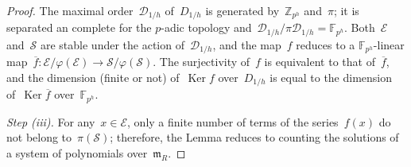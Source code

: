 \documentclass{article}
\theoremstyle{definition}
\let\ro\mathcal \let\go\mathfrak
\DeclareMathOperator\Ker{Ker}
\def\O{\ro O}
\def\Fp{{\mathbb{F}_p}}
\def\Fph{{\mathbb{F}_{p^h}}}
\begin{document}
\begin{proof}
% 
% 
The maximal order~$\ro D_{1/h}$ of~$D_{1/h}$ is
generated by~$ℤ_{p^h}$ and~$π$; it is separated an complete for the
$p$-adic topology and~$\ro D_{1/h} / π \ro D_{1/h} = \Fph$.
Both~$\ro E$ and~$\ro S$
are stable under the action of~$\ro D_{1/h}$, and the map~$f$ reduces to
a $\Fph$-linear map~$\overline{f}: \ro E / φ(\ro E) → \ro S / φ(\ro S)$.
The surjectivity of~$f$ is equivalent to that of~$\overline{f}$, and the
dimension (finite or not) of~$\Ker f$ over~$D_{1/h}$ is equal to the
dimension of~$\Ker \overline{f}$ over~$\Fph$.

\emph{Step (iii).}
For any~$x ∈ \ro E$, only a finite number of terms of the series~$f(x)$
do not belong to~$π(\ro S)$;
therefore, the Lemma reduces to counting the
solutions of a system of polynomials over~$\go m_R$.


\end{proof}
\end{document}

